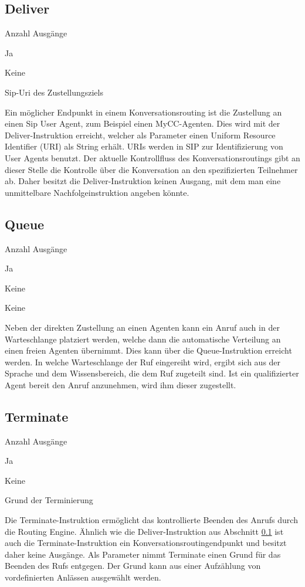 \subsection{Deliver}
\label{subsec:Deliver}
\begin{labeling}{Anzahl Ausgänge}
\item [Eingang] Ja
\item [Anzahl Ausgänge] Keine
\item [Parameter] Sip-Uri des Zustellungsziels
\item [Beschreibung] Ein möglicher Endpunkt in einem Konversationsrouting ist die Zustellung an einen Sip User Agent, zum Beispiel einen MyCC-Agenten. Dies wird mit der Deliver-Instruktion erreicht, welcher als Parameter einen Uniform Resource Identifier (URI) als String erhält. URIs werden in SIP zur Identifizierung von User Agents benutzt. Der aktuelle Kontrollfluss des Konversationsroutings gibt an dieser Stelle die Kontrolle über die Konversation an den spezifizierten Teilnehmer ab. Daher besitzt die Deliver-Instruktion keinen Ausgang, mit dem man eine unmittelbare Nachfolgeinstruktion angeben könnte.
\end{labeling}

\subsection{Queue}
\label{subsec:Queue}
\begin{labeling}{Anzahl Ausgänge}
\item [Eingang] Ja
\item [Anzahl Ausgänge] Keine
\item [Parameter] Keine
\item [Beschreibung] Neben der direkten Zustellung an einen Agenten kann ein Anruf auch in der Warteschlange platziert werden, welche dann die automatische Verteilung an einen freien Agenten übernimmt. Dies kann über die Queue-Instruktion erreicht werden. In welche Warteschlange der Ruf eingereiht wird, ergibt sich aus der Sprache und dem Wissensbereich, die dem Ruf zugeteilt sind. Ist ein qualifizierter Agent bereit den Anruf anzunehmen, wird ihm dieser zugestellt.
\end{labeling}

\subsection{Terminate}
\label{subsec:terminate}
\begin{labeling}{Anzahl Ausgänge}
\item [Eingang] Ja
\item [Anzahl Ausgänge] Keine
\item [Parameter] Grund der Terminierung
\item [Beschreibung] Die Terminate-Instruktion ermöglicht das kontrollierte Beenden des Anrufs durch die Routing Engine. Ähnlich wie die Deliver-Instruktion aus Abschnitt \ref{subsec:Deliver} ist auch die Terminate-Instruktion ein Konversationsroutingendpunkt und besitzt daher keine Ausgänge. Als Parameter nimmt Terminate einen Grund für das Beenden des Rufs entgegen. Der Grund kann aus einer Aufzählung von vordefinierten Anlässen ausgewählt werden.
\end{labeling}

